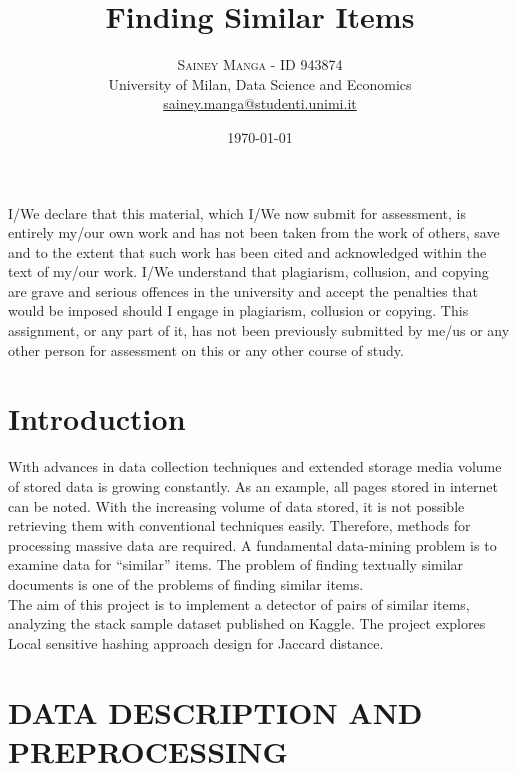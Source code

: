 \documentclass[12pt]{article}
\title{Finding Similar Items} %
\author{%
	\textsc{Sainey Manga - ID 943874}\\[1ex] %
	\normalsize University of Milan, Data Science and Economics \\ %
	\normalsize \href{mailto:sainey.manga@studenti.unimi.it}{sainey.manga@studenti.unimi.it} %
}
\date{\today} %
\begin{document}
	
	\maketitle
	
	
	I/We declare that this material, which I/We now submit for assessment, is entirely my/our own work and has not been taken from the work of others, save and to the extent that such work has been cited and acknowledged within the text of my/our work. I/We understand that plagiarism, collusion, and copying are grave and serious offences in the university and accept the penalties that would be imposed should I engage in plagiarism, collusion or copying. This assignment, or any part of it, has not been previously submitted by me/us or any other person for assessment on this or any other course of study.
	\section{Introduction}
	
	\lettrine[nindent=0em,lines=3]{W} ith advances in data collection techniques and extended storage media volume of stored data is growing constantly. As an example, all pages stored in internet can be noted. With the increasing volume of data stored, it is not possible retrieving them with conventional techniques easily. Therefore, methods for processing massive data are required. A fundamental data-mining problem is to examine data for “similar” items. The problem of finding textually similar documents is one of the problems of finding similar items. 
\\
	The aim of this project is to implement a detector of pairs of similar items, analyzing the stack sample dataset published on Kaggle. The project explores Local sensitive hashing approach design for Jaccard distance.

	
	
	\section{DATA DESCRIPTION AND PREPROCESSING}
	
\end{document}
